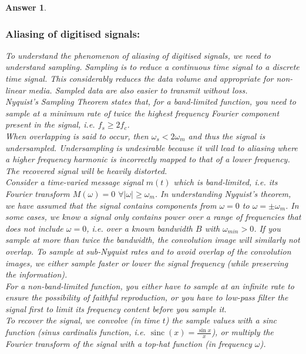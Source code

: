 \documentclass[a4paper]{article}
\DeclareMathOperator{\sinc}{sinc}
\newtheorem{ans}{Answer}[subsection]
\theoremstyle{new}
\begin{document}
\begin{ans}
\subsubsection*{Aliasing of digitised signals:}
To understand the phenomenon of aliasing of digitised signals, we need to understand sampling. Sampling is to reduce a continuous time signal to a discrete time signal. This considerably reduces the data volume and appropriate for non-linear media. Sampled data are also easier to transmit without loss.\\[5pt]
Nyquist's Sampling Theorem states that, for a band-limited function, you need to sample at a minimum rate of twice the highest frequency Fourier component present in the signal, i.e. $f_s\geq 2f_c$.\\[5pt]
When overlapping is said to occur, then $\omega_s<2\omega_m$ and thus the signal is undersampled. Undersampling is undesirable because it will lead to aliasing where a higher frequency harmonic is incorrectly mapped to that of a lower frequency. The recovered signal will be heavily distorted.\\[5pt]
Consider a time-varied message signal $m(t)$ which is band-limited, i.e. its Fourier transform $M(\omega)=0$ $\forall|\omega|\geq\omega_m$. In understanding Nyquist's theorem, we have assumed that the signal contains components from $\omega=0$ to $\omega=\pm\omega_m$. In some cases, we know a signal only contains power over a range of frequencies that does not include $\omega=0$, i.e. over a known bandwidth $B$ with $\omega_{min}>0$. If you sample at more than twice the bandwidth, the convolution image will similarly not overlap. To sample at sub-Nyquist rates and to avoid overlap of the convolution images, we either sample faster or lower the signal frequency (while preserving the information).\\[5pt]
For a non-band-limited function, you either have to sample at an infinite rate to ensure the possibility of faithful reproduction, or you have to low-pass filter the signal first to limit its frequency content before you sample it.\\[5pt]
To recover the signal, we convolve (in time $t$) the sample values with a sinc function (sinus cardinalis function, i.e. $\sinc(x)=\frac{\sin x}{x}$), or multiply the Fourier transform of the signal with a top-hat function (in frequency $\omega$).

\end{ans}
\end{document}
